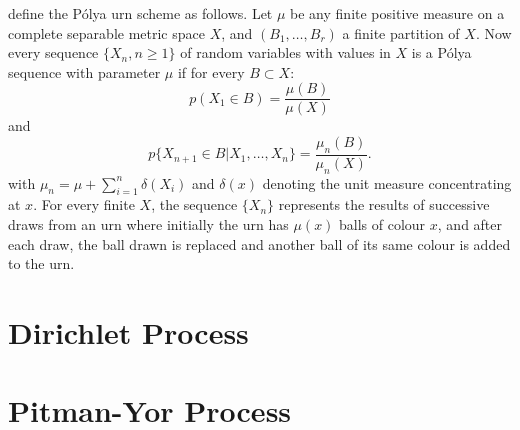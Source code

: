 \textcite{Blackwell1973Ferguson} define the P\'olya urn scheme as follows. Let $\mu$ be any finite positive measure on a complete separable metric space $X$, and $(B_1,\dots,B_r)$ a finite partition of $X$. Now every sequence $\{X_n,n\geq 1\}$ of random variables with values in $X$ is a P\'olya sequence with parameter $\mu$ if for every $B\subset X$:
\begin{equation}
	p(X_1\in B) = \frac{\mu(B)}{\mu(X)}
\end{equation}
and
\begin{equation}
	p\{X_{n+1}\in B | X_1,\ldots,X_n\} = \frac{\mu_n(B)}{\mu_n(X)}.
\end{equation}
with $\mu_n = \mu + \sum_{i=1}^n \delta(X_i)$ and $\delta(x)$ denoting the unit measure concentrating at $x$. For every finite $X$, the sequence $\{X_n\}$ represents the results of successive draws from an urn where initially the urn has $\mu(x)$ balls of colour $x$, and after each draw, the ball drawn is replaced and another ball of its same colour is added to the urn.




\section{Dirichlet Process}

\section{Pitman-Yor Process}
